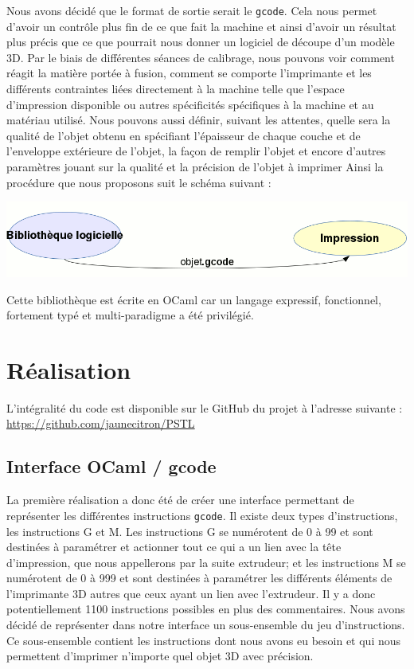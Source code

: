 \documentclass[11pt, titlepage]{article}
\begin{document}
Nous avons décidé que le format de sortie serait le \verb&gcode&. Cela nous permet d'avoir un contrôle plus fin de ce que fait la machine et ainsi d'avoir un résultat plus précis que ce que pourrait nous donner un logiciel de découpe d'un modèle 3D.
Par le biais de différentes séances de calibrage, nous pouvons voir comment réagit la matière portée à fusion, comment se comporte l'imprimante et les différents contraintes liées directement à la machine telle que l'espace d'impression disponible ou autres spécificités spécifiques à la machine et au matériau utilisé.
Nous pouvons aussi définir, suivant les attentes, quelle sera la qualité de l'objet obtenu en spécifiant l'épaisseur de chaque couche et de l'enveloppe extérieure de l'objet, la façon de remplir l'objet et encore d'autres paramètres jouant sur la qualité et la précision de l'objet à imprimer
Ainsi la procédure que nous proposons suit le schéma suivant :
\begin{center}\includegraphics[scale=0.35]{img/Motivation.png}\end{center}

Cette bibliothèque est écrite en OCaml car un langage expressif, fonctionnel, fortement typé et multi-paradigme a été privilégié.

\newpage
\section{Réalisation}
L'intégralité du code est disponible sur le GitHub du projet à l'adresse suivante :
\url{https://github.com/jaunecitron/PSTL}

\subsection{Interface OCaml / gcode}
La première réalisation a donc été de créer une interface permettant de représenter les différentes instructions \verb&gcode&. Il existe deux types d'instructions, les instructions G et M. Les instructions G se numérotent de 0 à 99 et sont destinées à paramétrer et actionner tout ce qui a un lien avec la tête d'impression, que nous appellerons par la suite extrudeur; et les instructions M se numérotent de 0 à 999 et sont destinées à paramétrer les différents éléments de l'imprimante 3D autres que ceux ayant un lien avec l'extrudeur. Il y a donc potentiellement 1100 instructions possibles en plus des commentaires.
Nous avons décidé de représenter dans notre interface un sous-ensemble du jeu d'instructions. Ce sous-ensemble contient les instructions dont nous avons eu besoin et qui nous permettent d'imprimer n'importe quel objet 3D avec précision.
\newline
\end{document}
